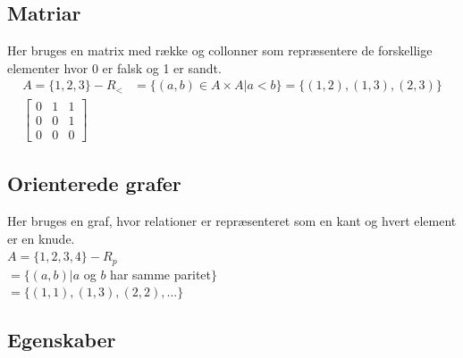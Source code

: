 \documentclass[12pt, a4paper]{article}
\begin{document}
				\subsection{Matriar}
					Her bruges en matrix med række og collonner som repræsentere de forskellige elementer hvor 0 er falsk og 1 er sandt.\\
					\begin{align*}
					A=\{1,2,3\} - R_<&=\{(a,b)\in A\times A | a<b\} = \{(1,2),(1,3),(2,3)\}\\
					\begin{bmatrix}
					0 & 1 & 1\\
					0 & 0 & 1\\
					0 & 0 & 0
					\end{bmatrix}
					\end{align*}
				\subsection{Orienterede grafer}
				\begin{minipage}{0.75\textwidth}
						Her bruges en graf, hvor relationer er repræsenteret som en kant og hvert element er en knude.\\
						$A=\{1,2,3,4\} - R_p$\\
						$=\{(a,b) | a $ og $b$ har samme paritet$\}$ \\
						$= \{(1,1),(1,3),(2,2),...\}$\\
					\end{minipage}
					\hfill
				\begin{minipage}{0.15\textwidth}
					\end{minipage}
				\subsection{Egenskaber}
\end{document}
